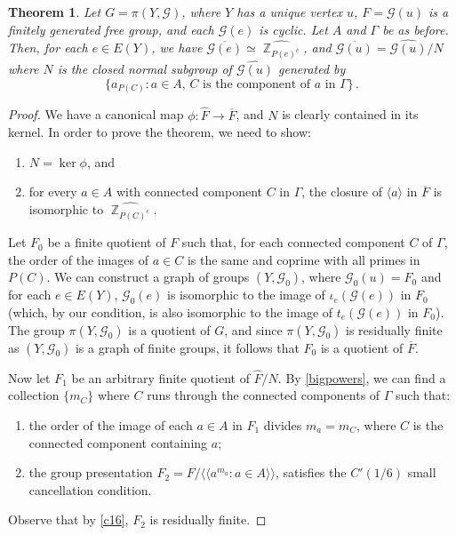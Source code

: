 \documentclass[a4paper]{amsart}
\newtheorem{teo}[lem]{Theorem}
\theoremstyle{definition}
\theoremstyle{remark}
\DeclareMathOperator{\bbz}{\mathbb{Z}}
\newcommand{\G}{\mathcal G}
\begin{document}
\begin{teo}\label{profinitecompletion}
Let \(G = \pi(Y, \G)\), where \(Y\) has a unique vertex \(u\), \(F = \G(u)\) is a finitely generated free group, and each \(\G(e)\) is cyclic. Let \(A\) and \(\Gamma\) be as before. 
Then, for each \(e \in E(Y)\), we have \(\overline{\G(e)} \simeq \widehat{\bbz_{P(e)^c}}\), and \(\overline{\G(u)} = \widehat{\G(u)}/N\) where \(N\) is the closed normal subgroup of  \(\widehat{\G(u)}\) generated by \[\{a_{P(C)} : a \in A, \, C \text{ is the component of } a \text{ in } \Gamma\}\,.\]
\end{teo}
\begin{proof} We have a canonical map \(\phi\colon \widehat{F} \to \overline{F}\), and \(N\) is clearly contained in its kernel. In order to prove the theorem, we need to show:
\begin{enumerate}
    \item \(N = \ker \phi\), and
    \item for every \(a \in A\) with connected component \(C\) in \(\Gamma\), the closure of \(\langle a \rangle\) in \(\overline{F}\) is isomorphic to \(\widehat{\bbz_{P(C)^c}}\).
\end{enumerate}

Let \(F_0\) be a finite quotient of \(F\) such that, for each connected component \(C\) of \(\Gamma\), the order of the images of \(a \in C\) is the same and coprime with all primes in \(P(C)\). We can construct a graph of groups \((Y,\G_0)\), where \(\G_0(u) = F_0\) and for each \(e \in E(Y)\), \(\G_0(e)\) is isomorphic to the image of \(\iota_e(\G(e))\) in \(F_0\) (which, by our condition, is also isomorphic to the image of \(t_e(\G(e))\) in \(F_0\)). The group \(\pi(Y,\G_0)\) is a quotient of \(G\), and since \(\pi(Y,\G_0)\) is residually finite as \((Y,\G_0)\) is a graph of finite groups, it follows that \(F_0\) is a quotient of \(\overline{F}\).

Now let \(F_1\) be an arbitrary finite quotient of \(\widehat{F}/N\). By \cref{bigpowers}, we can find a collection \(\{m_C\}\) where \(C\) runs through the connected components of \(\Gamma\) such that:
\begin{enumerate}
    \item the order of the image of each \(a\in A\) in \(F_1\) divides \(m_a =m_C\), where \(C\) is the connected component containing \(a\);
    \item the group presentation \(F_2 = F/\langle\!\langle a^{m_a} \colon a \in A \rangle\!\rangle\), satisfies the \(C'(1/6)\) small cancellation condition.
\end{enumerate}
Observe that by \cref{c16}, \(F_2\) is residually finite.


\end{proof}
\end{document}
